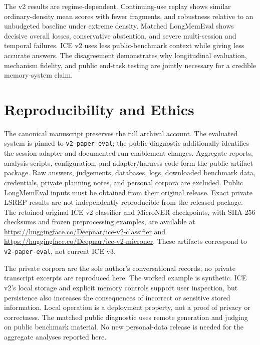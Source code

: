 \documentclass[twoside,11pt]{article}
\begin{document}
The v2 results are regime-dependent. Continuing-use replay shows similar ordinary-density mean scores with fewer fragments, and robustness relative to an unbudgeted baseline under extreme density. Matched LongMemEval shows decisive overall losses, conservative abstention, and severe multi-session and temporal failures. ICE v2 uses less public-benchmark context while giving less accurate answers. The disagreement demonstrates why longitudinal evaluation, mechanism fidelity, and public end-task testing are jointly necessary for a credible memory-system claim.

\section{Reproducibility and Ethics}
\label{sec:repro}
The canonical manuscript preserves the full archival account. The evaluated system is pinned to \texttt{v2-paper-eval}; the public diagnostic additionally identifies the session adapter and documented run-enablement changes. Aggregate reports, analysis scripts, configuration, and adapter/harness code form the public artifact package. Raw answers, judgements, databases, logs, downloaded benchmark data, credentials, private planning notes, and personal corpora are excluded. Public LongMemEval inputs must be obtained from their original release. Exact private LSREP results are not independently reproducible from the released package. The retained original ICE v2 classifier and MicroNER checkpoints, with SHA-256 checksums and frozen preprocessing examples, are available at \url{https://huggingface.co/Deepnar/ice-v2-classifier} and \url{https://huggingface.co/Deepnar/ice-v2-microner}. These artifacts correspond to \texttt{v2-paper-eval}, not current ICE v3.

The private corpora are the sole author's conversational records; no private transcript excerpts are reproduced here. The worked example is synthetic. ICE v2's local storage and explicit memory controls support user inspection, but persistence also increases the consequences of incorrect or sensitive stored information. Local operation is a deployment property, not a proof of privacy or correctness. The matched public diagnostic uses remote generation and judging on public benchmark material. No new personal-data release is needed for the aggregate analyses reported here.


\begin{samepage}
\end{samepage}
\end{document}
